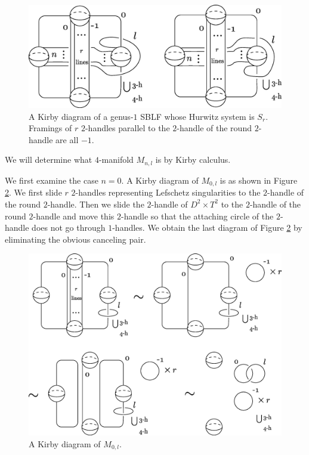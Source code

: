 \documentclass{amsart}
\theoremstyle{plain}
\theoremstyle{definition}
\begin{document}
\begin{figure}[htbp]
\begin{center}
\includegraphics[width=130mm]{BLF-S_r.eps}
\end{center}
\caption{A Kirby diagram of a genus-$1$ SBLF whose Hurwitz system is $S_r$. 
Framings of $r$ $2$-handles parallel to the $2$-handle of the round $2$-handle are all $-1$. }
\label{BLF-S_r}
\end{figure}

We will determine what $4$-manifold $M_{n,l}$ is by Kirby calculus. 

\par

We first examine the case $n=0$. 
A Kirby diagram of $M_{0,l}$ is as shown in Figure \ref{S_r-n=0}. 
We first slide $r$ $2$-handles representing Lefschetz singularities to the $2$-handle of the round $2$-handle. 
Then we slide the $2$-handle of $D^2\times T^2$ to the $2$-handle of the round $2$-handle 
and move this $2$-handle so that the attaching circle of the $2$-handle does not go through $1$-handles. 
We obtain the last diagram of Figure \ref{S_r-n=0} by eliminating the obvious canceling pair. 

\begin{figure}[htb]
\begin{center}
\includegraphics[width=135mm]{S_r.eps}
\end{center}
\caption{A Kirby diagram of $M_{0,l}$. }
\label{S_r-n=0}
\end{figure}
\end{document}
